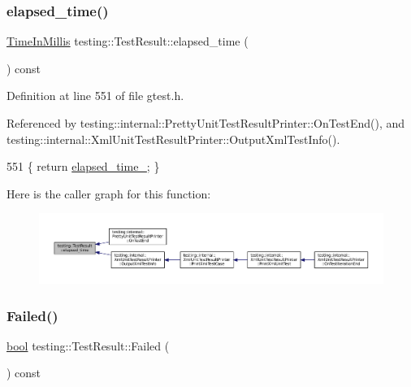 \subsubsection{\texorpdfstring{elapsed\+\_\+time()}{elapsed\_time()}}
{\footnotesize\ttfamily \hyperlink{namespacetesting_a992de1d091ce660f451d1e8b3ce30fd6}{Time\+In\+Millis} testing\+::\+Test\+Result\+::elapsed\+\_\+time (\begin{DoxyParamCaption}{ }\end{DoxyParamCaption}) const\hspace{0.3cm}{\ttfamily [inline]}}



Definition at line 551 of file gtest.\+h.



Referenced by testing\+::internal\+::\+Pretty\+Unit\+Test\+Result\+Printer\+::\+On\+Test\+End(), and testing\+::internal\+::\+Xml\+Unit\+Test\+Result\+Printer\+::\+Output\+Xml\+Test\+Info().


\begin{DoxyCode}
551 \{ \textcolor{keywordflow}{return} \hyperlink{classtesting_1_1TestResult_a739a8ca54db4be004ba748b11e82b056}{elapsed\_time\_}; \}
\end{DoxyCode}
Here is the caller graph for this function\+:
\nopagebreak
\begin{figure}[H]
\begin{center}
\leavevmode
\includegraphics[width=350pt]{classtesting_1_1TestResult_a717e05e00d4af5cb809433e343ab63af_icgraph}
\end{center}
\end{figure}
\mbox{\label{classtesting_1_1TestResult_afacc37e8b43c8574e4101bc61723c769}} 
\subsubsection{\texorpdfstring{Failed()}{Failed()}}
{\footnotesize\ttfamily \hyperlink{classbool}{bool} testing\+::\+Test\+Result\+::\+Failed (\begin{DoxyParamCaption}{ }\end{DoxyParamCaption}) const}



